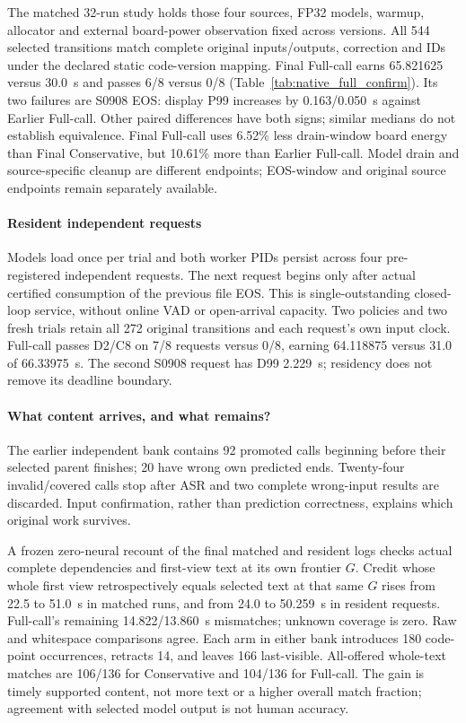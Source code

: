 The matched 32-run study holds those four sources, FP32 models, warmup,
allocator and external board-power observation fixed across versions.
All 544 selected transitions match complete original inputs/outputs,
correction and IDs under the declared static code-version mapping.
Final Full-call earns 65.821625 versus 30.0~s and passes 6/8 versus 0/8
(Table~\ref{tab:native_full_confirm}). Its two failures are S0908 EOS:
display P99 increases by 0.163/0.050~s against Earlier Full-call.
Other paired differences have both signs; similar medians do not establish
equivalence. Final Full-call uses 6.52\% less drain-window board energy
than Final Conservative, but 10.61\% more than Earlier Full-call.
Model drain and source-specific cleanup are different endpoints;
EOS-window and original source endpoints remain separately available.

\paragraph{Resident independent requests}
Models load once per trial and both worker PIDs persist across four
pre-registered independent requests. The next request begins only after
actual certified consumption of the previous file EOS. This is
single-outstanding closed-loop service, without online VAD or open-arrival
capacity. Two policies and two fresh trials retain all 272 original
transitions and each request's own input clock. Full-call passes D2/C8 on
7/8 requests versus 0/8, earning 64.118875 versus 31.0 of 66.33975~s.
The second S0908 request has D99 2.229~s; residency does not remove its
deadline boundary.

\paragraph{What content arrives, and what remains?}
The earlier independent bank contains 92 promoted calls beginning before
their selected parent finishes; 20 have wrong own predicted ends.
Twenty-four invalid/covered calls stop after ASR and two complete
wrong-input results are discarded. Input confirmation, rather than
prediction correctness, explains which original work survives.

A frozen zero-neural recount of the final matched and resident logs
checks actual complete dependencies and first-view text at its own
frontier $G$. Credit whose whole first view retrospectively equals
selected text at that same $G$ rises from 22.5 to 51.0~s in matched runs,
and from 24.0 to 50.259~s in resident requests. Full-call's remaining
14.822/13.860~s mismatches; unknown coverage is zero. Raw and whitespace
comparisons agree. Each arm in either bank introduces 180 code-point
occurrences, retracts 14, and leaves 166 last-visible. All-offered
whole-text matches are 106/136 for Conservative and 104/136 for Full-call.
The gain is timely supported content, not more text or a higher overall
match fraction; agreement with selected model output is not human accuracy.


